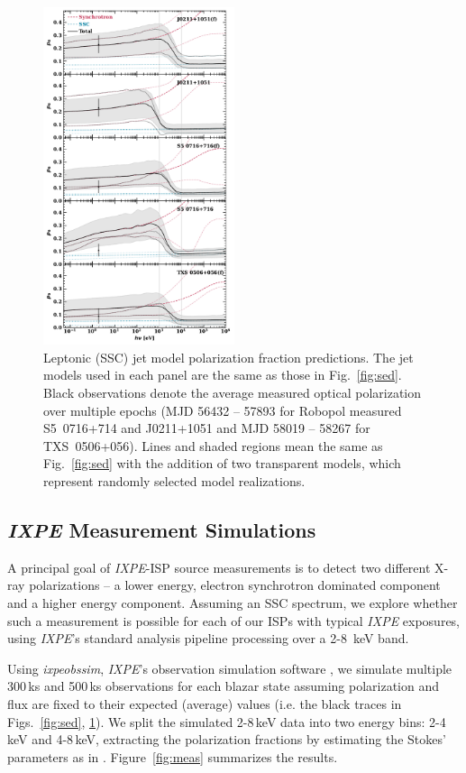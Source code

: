 \begin{figure}
    \centering
    \includegraphics[width=0.5\textwidth]{figures/pol_all.pdf}
    \caption{Leptonic (SSC) jet model polarization fraction predictions. The jet models used in each panel are the same as those in Fig.~\ref{fig:sed}. Black observations denote the average measured optical polarization over multiple epochs (MJD 56432 -- 57893 for Robopol measured S5~0716+714 and J0211+1051 \citep{blinov_robopol_2021} and MJD 58019 -- 58267 for TXS~0506+056). Lines and shaded regions mean the same as Fig.~\ref{fig:sed} with the addition of two transparent models, which represent randomly selected model realizations.}
    \label{fig:pol}
\end{figure}

\subsection{{\it IXPE} Measurement Simulations}
\label{sec:ixpe}

A principal goal of {\it IXPE}-ISP source measurements is to detect two different X-ray polarizations -- a lower energy, electron synchrotron dominated component and a higher energy component.  Assuming an SSC spectrum, we explore whether such a measurement is possible for each of our ISPs with typical {\it IXPE} exposures, using {\it IXPE}'s standard analysis pipeline processing over a 2-8~keV band.  

Using \textit{ixpeobssim}, {\it IXPE}'s observation simulation software \citep{pesce-rollins_observation-simulation_2019}, we simulate multiple 300\,ks and 500\,ks observations for each blazar state assuming polarization and flux are fixed to their expected (average) values (i.e. the black traces in Figs.~\ref{fig:sed}, \ref{fig:pol}). We split the simulated 2-8\,keV data into two energy bins: 2-4\,keV and 4-8\,keV, extracting the polarization fractions by estimating the Stokes' parameters as in \citet{kislat_analyzing_2015}. Figure~\ref{fig:meas} summarizes the results.

